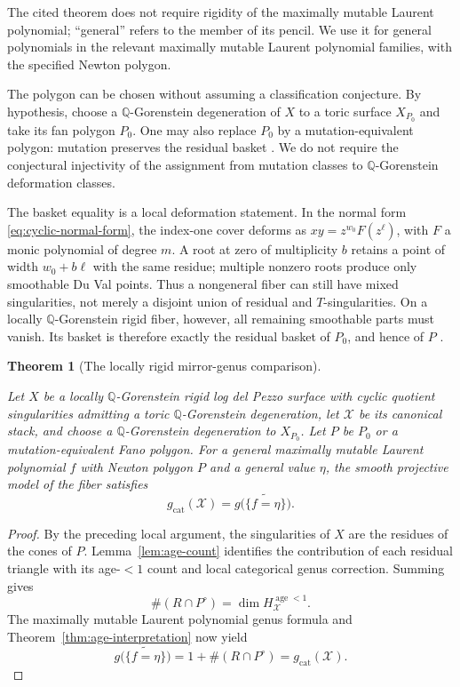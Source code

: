 \documentclass[11pt]{article}
\theoremstyle{plain}
\newtheorem{theorem}{Theorem}[section]
\theoremstyle{definition}
\theoremstyle{remark}
\newcommand{\cX}{\mathcal X}
\newcommand{\Q}{\mathbb Q}
\newcommand{\1}{\mathbf 1}
\begin{document}
The cited theorem does not require rigidity of the maximally mutable Laurent polynomial; ``general'' refers to the member of its pencil.  We use it for general polynomials in the relevant maximally mutable Laurent polynomial families, with the specified Newton polygon.

The polygon can be chosen without assuming a classification conjecture.  By hypothesis, choose a $\Q$-Gorenstein degeneration of $X$ to a toric surface $X_{P_0}$ and take its fan polygon $P_0$.  One may also replace $P_0$ by a mutation-equivalent polygon: mutation preserves the residual basket \cite[Theorem 3 and its proof]{ACC+}.  We do not require the conjectural injectivity of the assignment from mutation classes to $\Q$-Gorenstein deformation classes.

The basket equality is a local deformation statement.  In the normal form \eqref{eq:cyclic-normal-form}, the index-one cover deforms as $xy=z^{w_0}F(z^\ell)$, with $F$ a monic polynomial of degree $m$.  A root at zero of multiplicity $b$ retains a point of width $w_0+b\ell$ with the same residue; multiple nonzero roots produce only smoothable Du Val points.  Thus a nongeneral fiber can still have mixed singularities, not merely a disjoint union of residual and $T$-singularities.  On a locally $\Q$-Gorenstein rigid fiber, however, all remaining smoothable parts must vanish.  Its basket is therefore exactly the residual basket of $P_0$, and hence of $P$ \cite[Basic Concepts; Lemma 6 and proof of Theorem 3]{ACC+}.

\begin{theorem}[The locally rigid mirror-genus comparison]\label{cor:genus-match}

Let $X$ be a locally $\Q$-Gorenstein rigid log del Pezzo surface with cyclic quotient singularities admitting a toric $\Q$-Gorenstein degeneration, let $\cX$ be its canonical stack, and choose a $\Q$-Gorenstein degeneration to $X_{P_0}$.  Let $P$ be $P_0$ or a mutation-equivalent Fano polygon.  For a general maximally mutable Laurent polynomial $f$ with Newton polygon $P$ and a general value $\eta$, the smooth projective model of the fiber satisfies
\[
\boxed{
g_{\mathrm{cat}}(\cX)
=g\bigl(\widetilde{\{f=\eta\}}\bigr).}
\]
\end{theorem}

\begin{proof}
By the preceding local argument, the singularities of $X$ are the residues of the cones of $P$.  Lemma~\ref{lem:age-count} identifies the contribution of each residual triangle with its age-$<1$ count and local categorical genus correction.  Summing gives
\[
\#(R\cap P^\circ)=\dim H^{\operatorname{age}<1}_{\cX}.
\]
The maximally mutable Laurent polynomial genus formula \cite[Theorem 3.13]{CKPT} and Theorem~\ref{thm:age-interpretation} now yield
\[
g\bigl(\widetilde{\{f=\eta\}}\bigr)
=1+\#(R\cap P^\circ)
=g_{\mathrm{cat}}(\cX).
\]
\end{proof}
\end{document}
